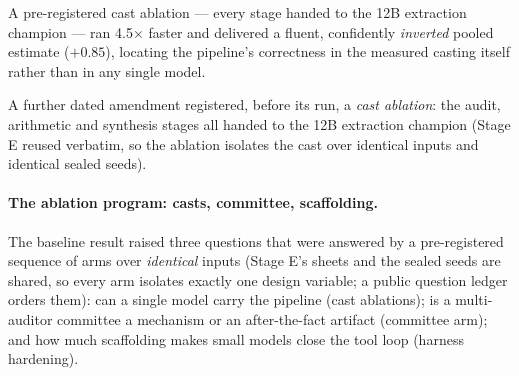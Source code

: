 
 A pre-registered cast ablation --- every stage handed to the 12B extraction champion --- ran 4.5$\times$ faster and delivered a fluent, confidently \emph{inverted} pooled estimate ($+0.85$), locating the pipeline's correctness in the measured casting itself rather than in any single model.

 A further dated amendment registered, before its run, a \emph{cast ablation}: the audit, arithmetic and synthesis stages all handed to the 12B extraction champion (Stage E reused verbatim, so the ablation isolates the cast over identical inputs and identical sealed seeds).

\paragraph{The ablation program: casts, committee, scaffolding.} The baseline result raised three questions that were answered by a pre-registered sequence of arms over \emph{identical} inputs (Stage E's sheets and the sealed seeds are shared, so every arm isolates exactly one design variable; a public question ledger orders them): can a single model carry the pipeline (cast ablations); is a multi-auditor committee a mechanism or an after-the-fact artifact (committee arm); and how much scaffolding makes small models close the tool loop (harness hardening).

